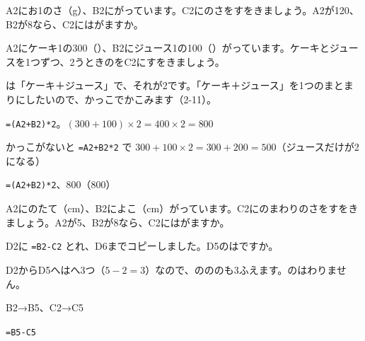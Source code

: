 \begin{jibun}
A2にお1のさ（g）、B2にがっています。C2にのさをすをきましょう。A2が120、B2が8なら、C2にはがますか。
\end{jibun}

\begin{reidai}[かっこが\R{要}{い}る\R{式}{しき}]
A2にケーキ1の300（）、B2にジュース1の100（）がっています。ケーキとジュースを1つずつ、2うときのをC2にすをきましょう。\par
{}は「ケーキ＋ジュース」で、それが2です。「ケーキ＋ジュース」を1つのまとまりにしたいので、かっこでかこみます（2-11）。\par
\shiki \texttt{=(A2+B2)*2}。$(300+100)\times2=400\times2=800$\par
\hspace*{2.6\zw}かっこがないと \texttt{=A2+B2*2} で $300+100\times2=300+200=500$（ジュースだけが2になる）\par
\kotae \texttt{=(A2+B2)*2}、800（800）
\end{reidai}

\begin{jibun}
A2にのたて（cm）、B2によこ（cm）がっています。C2にのまわりのさをすをきましょう。A2が5、B2が8なら、C2にはがますか。
\end{jibun}

\begin{reidai}[\R{式}{しき}のコピー]
D2に \texttt{=B2-C2} とれ、D6までコピーしました。D5のはですか。\par
\kangaekata D2からD5へはへ3つ（$5-2=3$）なので、のののも3ふえます。のはわりません。\par
\shiki B2→B5、C2→C5\par
\kotae \texttt{=B5-C5}
\end{reidai}


